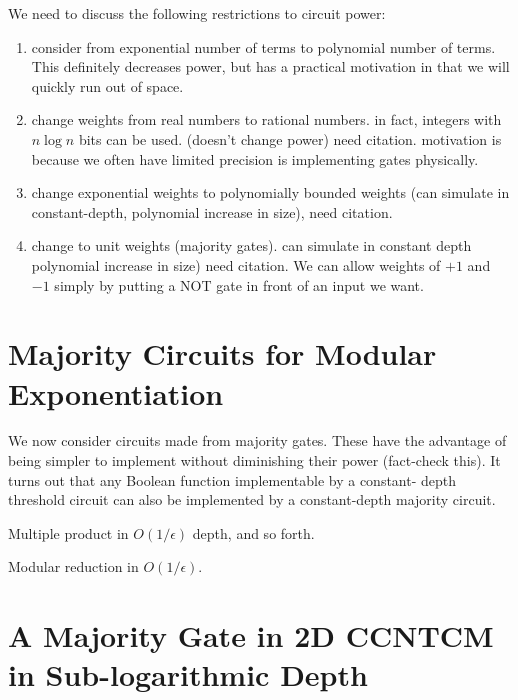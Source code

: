 We need to discuss the following restrictions to circuit power:

\begin{enumerate}

\item
consider from exponential number of terms to polynomial number
of terms. This definitely decreases power, but has a practical
motivation in that we will quickly run out of space.

\item
change weights from real numbers to rational numbers. in fact,
integers with $n \log n$ bits can be used. (doesn't change power) need citation. motivation is because we often have limited precision is
implementing gates physically.

\item
change exponential weights to polynomially bounded weights (can simulate in constant-depth, polynomial increase in size), need
citation.

\item
change to unit weights (majority gates). can simulate in
constant depth polynomial increase in size) need citation.
We can allow weights of $+1$ and $-1$ simply by putting a
NOT gate in front of an input we want.

\end{enumerate}

\section{Majority Circuits for Modular Exponentiation}

We now consider circuits made from majority gates. These have the
advantage of being simpler to implement without diminishing their power
(fact-check this).
It turns out that any Boolean function implementable by a constant-
depth threshold circuit can also be implemented by a constant-depth
majority circuit.

\begin{theorem}
Multiple product in $O(1/\epsilon)$ depth, and so forth.
\end{theorem}

\begin{theorem}
Modular reduction in $O(1/\epsilon)$.
\end{theorem}

\section{A Majority Gate in 2D CCNTCM in Sub-logarithmic Depth}


